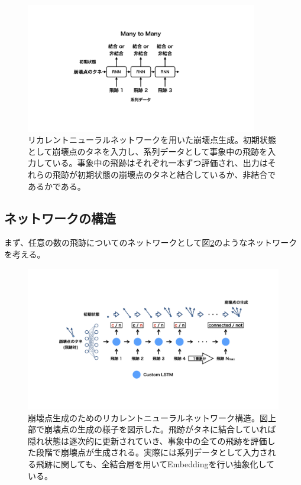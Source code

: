 \begin{figure}[htbp]
 \centering
 \includegraphics[trim = 200 150 200 150, width=0.9\textwidth, clip]{Figure/3Networks/3-4-0-1VertexProductionwithRNN.png}
 \caption[リカレントニューラルネットワークを用いた崩壊点生成]{リカレントニューラルネットワークを用いた崩壊点生成。初期状態として崩壊点のタネを入力し、系列データとして事象中の飛跡を入力している。事象中の飛跡はそれぞれ一本ずつ評価され、出力はそれらの飛跡が初期状態の崩壊点のタネと結合しているか、非結合であるかである。}
 \label{3-4-0-1VertexProductionwithRNN}
\end{figure}


\subsection{ネットワークの構造} \label{Net:VLSTM:StructureofVLSTM}

まず、任意の数の飛跡についてのネットワークとして図\ref{3-4-1-1SimpleVLSTM}のようなネットワークを考える。

\begin{figure}[htbp]
 \centering
 \includegraphics[trim = 100 200 100 200, width=1.0\textwidth, clip]{Figure/3Networks/3-4-1-1SimpleVLSTM.png}
 \caption[崩壊点生成のためのリカレントニューラルネットワーク構造]{崩壊点生成のためのリカレントニューラルネットワーク構造。図上部で崩壊点の生成の様子を図示した。飛跡がタネに結合していれば隠れ状態は逐次的に更新されていき、事象中の全ての飛跡を評価した段階で崩壊点が生成される。実際には系列データとして入力される飛跡に関しても、全結合層を用いてEmbeddingを行い抽象化している。}
 \label{3-4-1-1SimpleVLSTM}
\end{figure}

